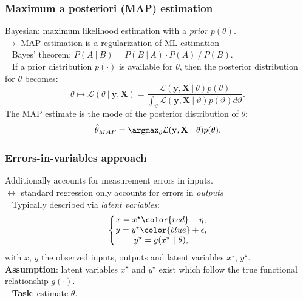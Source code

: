 \begin{frame}
	\frametitle{Maximum a posteriori (MAP) estimation}
	Bayesian: maximum likelihood estimation with a \emph{prior} $p(\theta)$. \\
	$\rightarrow$ MAP estimation is a regularization of ML estimation \\
	\ \newline
	\pause
	Bayes' theorem: $P(A\ |\ B) = P(B\ |\ A) \cdot P(A)\ /\ P(B)$.\\
	\ \newline
	\pause
	If a prior distribution $p(\cdot)$ is available for $\theta$, then the posterior distribution for $\theta$ becomes:
	\begin{equation*}
	\theta \mapsto \mathcal{L}(\theta\ |\ \mathbf{y}, \mathbf{X}) = \frac{\mathcal{L}(\mathbf{y}, \mathbf{X}\ |\ \theta)p(\theta)}{\int_\vartheta \mathcal{L}(\mathbf{y}, \mathbf{X}\ |\ \vartheta)p(\vartheta)d\vartheta}.
	\end{equation*}
	\pause
	The MAP estimate is the mode of the posterior distribution of $\theta$:
	\begin{equation*}
	\hat{\theta}_{MAP} = \argmax_{\theta} \mathcal{L}(\mathbf{y}, \mathbf{X}\ |\ \theta) p(\theta).
	\end{equation*}
	
\end{frame}

\begin{frame}
	\frametitle{Errors-in-variables approach}
	Additionally accounts for {\color{red}measurement errors in inputs}.\\
	$\leftrightarrow$ standard regression only accounts for {\color{blue}errors in \emph{outputs}} \\
	\ \newline
	\pause
	Typically described via \emph{latent variables}:
	\begin{align*}
	\left\{ \begin{matrix}
	x = x^\star {\color{red}+ \eta}, \\
	y = y^\star {\color{blue}+ \epsilon}, \\
	y^\star = g(x^\star\ |\ \theta),
	\end{matrix}\right.
	\end{align*}
	with $x$, $y$ the observed inputs, outputs and latent variables $x^\star$, $y^\star$.\\
	\pause
	\textbf{Assumption}: latent variables $x^\star$ and $y^\star$ exist which follow the true functional relationship $g(\cdot)$.\\
	\ \newline
	\pause
	\textbf{Task}: estimate $\theta$.
\end{frame}




